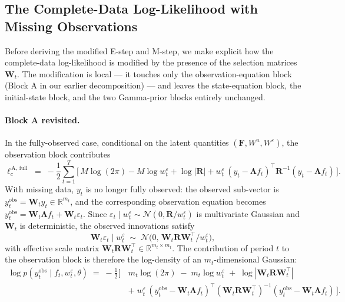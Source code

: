 \documentclass[11pt, a4paper, oneside]{article}
\newcommand{\mF}{\mathbf{F}}
\newcommand{\mL}{\boldsymbol{\Lambda}}
\newcommand{\mR}{\mathbf{R}}
\begin{document}
\newpage

\subsection{The Complete-Data Log-Likelihood with Missing Observations}
\label{subsec:loglik-missing}

Before deriving the modified E-step and M-step, we make explicit how
the complete-data log-likelihood is modified by the presence of the
selection matrices $\mathbf{W}_t$. The modification is local — it
touches only the observation-equation block (Block A in our earlier
decomposition) — and leaves the state-equation block, the
initial-state block, and the two Gamma-prior blocks entirely unchanged.

\paragraph{Block A revisited.}
In the fully-observed case, conditional on the latent quantities
$(\mF, W^u, W^\varepsilon)$, the observation block contributes
\[
\ell_c^{\,\text{A, full}} \;=\; -\frac{1}{2}\sum_{t=1}^{T}\!\Big[\,M\log(2\pi) - M\log w^\varepsilon_t + \log|\mR| + w^\varepsilon_t\,(y_t - \mL f_t)^{\top}\mR^{-1}(y_t - \mL f_t)\,\Big].
\]
With missing data, $y_t$ is no longer fully observed: the observed
sub-vector is $y_t^{\mathrm{obs}} = \mathbf{W}_t y_t \in \mathbb{R}^{m_t}$,
and the corresponding observation equation becomes
$y_t^{\mathrm{obs}} = \mathbf{W}_t \mL f_t + \mathbf{W}_t \varepsilon_t$.
Since $\varepsilon_t \mid w^\varepsilon_t \sim \mathcal{N}(0, \mR/w^\varepsilon_t)$
is multivariate Gaussian and $\mathbf{W}_t$ is deterministic, the
observed innovations satisfy
\[
\mathbf{W}_t\varepsilon_t \mid w^\varepsilon_t \;\sim\; \mathcal{N}\!\big(0,\, \mathbf{W}_t\mR\mathbf{W}_t^{\top}/w^\varepsilon_t\big),
\]
with effective scale matrix $\mathbf{W}_t\mR\mathbf{W}_t^{\top} \in \mathbb{R}^{m_t \times m_t}$.
The contribution of period $t$ to the observation block is therefore
the log-density of an $m_t$-dimensional Gaussian:
\[
\begin{aligned}
\log p(y_t^{\mathrm{obs}} \mid f_t, w^\varepsilon_t, \theta) \;=\; -\frac{1}{2}\Bigg[\,
& m_t\log(2\pi) \;-\; m_t\log w^\varepsilon_t \;+\; \log|\mathbf{W}_t\mR\mathbf{W}_t^{\top}| \\[4pt]
& +\; w^\varepsilon_t\,(y_t^{\mathrm{obs}} - \mathbf{W}_t\mL f_t)^{\top}(\mathbf{W}_t\mR\mathbf{W}_t^{\top})^{-1}(y_t^{\mathrm{obs}} - \mathbf{W}_t\mL f_t)\,\Bigg].
\end{aligned}
\]
\end{document}
